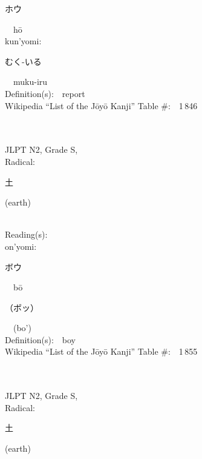 \begin{multicols}{2}
{\hspace*{2em}}{\begin{CJK}{UTF8}{min} ホウ \end{CJK}}\ \ h\=o\ \ \\
{\hspace*{1em}}kun'yomi:\ \ \\
{\hspace*{2em}}{\begin{CJK}{UTF8}{min} むく-いる \end{CJK}}\ \ muku-iru\ \ \\
Definition(s):\ \ report \\
Wikipedia ``List of the J\=oy\=o Kanji'' Table \#:\ \ 1\,846 \\
\ \ \\
{\fontsize{34pt}{40pt}  }\ \ \\  %
{JLPT N2, Grade S, \\Radical:\ \ {\begin{CJK}{UTF8}{min} 土 \end{CJK}} (earth) } \\
Reading(s):\ \ \\
{\hspace*{1em}}on'yomi:\ \ \\
{\hspace*{2em}}{\begin{CJK}{UTF8}{min} ボウ \end{CJK}}\ \ b\=o\ \ \\
{\hspace*{2em}}{\begin{CJK}{UTF8}{min} （ボッ） \end{CJK}}\ \ (bo')\ \ \\
Definition(s):\ \ boy \\
Wikipedia ``List of the J\=oy\=o Kanji'' Table \#:\ \ 1\,855 \\
\ \ \\
{\fontsize{34pt}{40pt}  }\ \ \\  %
{JLPT N2, Grade S, \\Radical:\ \ {\begin{CJK}{UTF8}{min} 土 \end{CJK}} (earth) } \\

\end{multicols}
